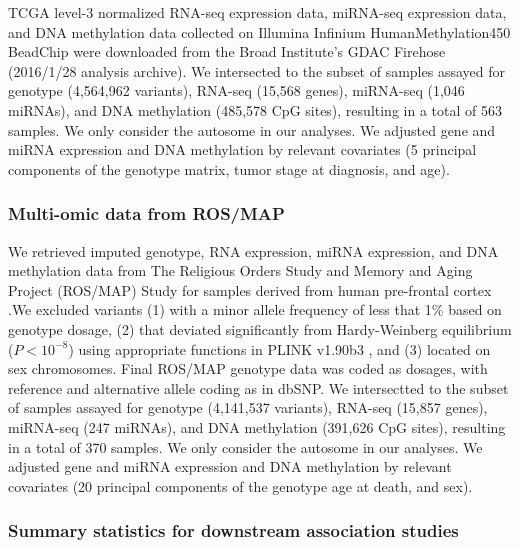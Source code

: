 TCGA level-3 normalized RNA-seq expression data,
miRNA-seq expression data, and DNA methylation
data collected on Illumina Infinium HumanMethylation450 BeadChip were downloaded
from the Broad Institute's GDAC Firehose (2016/1/28
analysis archive). We intersected to the subset
of samples assayed for
genotype (4,564,962 variants), 
RNA-seq (15,568 genes), 
miRNA-seq (1,046 miRNAs),
and DNA methylation (485,578 CpG sites), 
resulting in a total
of 563 samples. We only consider
the autosome in our analyses.
We adjusted gene and miRNA expression
and DNA methylation by relevant
covariates (5 principal 
components of the genotype 
matrix, tumor stage at diagnosis,
and age).

\subsubsection{Multi-omic data from ROS/MAP}

We retrieved imputed genotype, RNA expression,
miRNA expression, and DNA methylation data
from The Religious Orders Study and Memory and Aging Project (ROS/MAP) Study
for samples derived from human pre-frontal cortex
\cite{A.Bennett2013OverviewStudy,A.Bennett2013OverviewProject,DeJager2012ADecline}.We excluded variants (1) with a minor
allele frequency of less that 1\% based on
genotype
dosage, (2) that deviated significantly from
Hardy-Weinberg equilibrium ($P < 10^{-8}$)
using appropriate functions in PLINK v1.90b3
\cite{Wigginton2005,Purcell2007}, and
(3) located on sex chromosomes. 
Final ROS/MAP genotype data was coded as dosages,
with reference and alternative allele coding as in
dbSNP. We intersectted to the subset
of samples assayed for 
genotype (4,141,537 variants), 
RNA-seq (15,857 genes), 
miRNA-seq (247 miRNAs),
and DNA methylation (391,626 CpG sites), resulting in a total
of 370 samples. We only consider
the autosome in our analyses.
We adjusted gene and miRNA expression
and DNA methylation by relevant
covariates (20 principal 
components of the genotype 
age at death,
and sex).

\subsubsection{Summary statistics
for downstream association studies}


